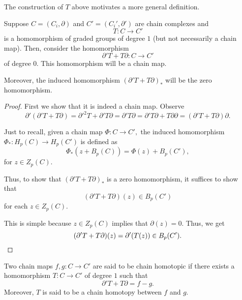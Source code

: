 \documentclass[12pt]{article}
\begin{document}
The construction of $T$ above motivates a more general definition.

\begin{prop}
	Suppose $C = (C_i, \partial)$ and $C' = (C_i', \partial')$ are chain complexes and
	\begin{equation*} 
		T: C \to C'
	\end{equation*}	
	is a homomorphism of graded groups of degree $1$ (but not necessarily a chain map). Then, consider the homomorphism
	\begin{equation*} 
		\partial' T + T\partial: C \to C'
	\end{equation*}
	of degree $0.$ This homomorphism will be a chain map.

	Moreover, the induced homomorphism $(\partial' T + T\partial)_*$ will be the zero homomorphism.
\end{prop}
\begin{proof} 
	First we show that it is indeed a chain map. Observe
	\begin{equation*} 
		\partial'(\partial' T + T\partial) = \partial'^2T + \partial'T\partial = \partial'T\partial = \partial'T\partial + T\partial\partial = (\partial'T + T\partial)\partial.
	\end{equation*}

	Just to recall, given a chain map $\Phi:C\to C',$ the induced homomorphism $\Phi_*:H_p(C) \to H_p(C')$ is defined as
	\begin{equation*} 
		\Phi_*(z + B_p(C)) = \Phi(z) + B_p(C'),
	\end{equation*}
	for $z \in Z_p(C).$

	Thus, to show that $(\partial' T + T\partial)_*$ is a zero homomorphism, it suffices to show that
	\begin{equation*} 
		(\partial' T + T\partial)(z) \in B_p(C')
	\end{equation*}
	for each $z \in Z_p(C).$

	This is simple because $z \in Z_p(C)$ implies that $\partial(z) = 0.$ Thus, we get
	\begin{equation*} 
		(\partial' T + T\partial)(z) = \partial'(T(z)) \in B_p(C'). \qedhere
	\end{equation*}
\end{proof}

\begin{defn}
	Two chain maps $f, g:C\to C'$ are said to be chain homotopic if there exists a homomorphism $T:C \to C'$ of degree $1$ such that 
	\begin{equation*} 
		\partial'T + T\partial = f - g.
	\end{equation*}
	Moreover, $T$ is said to be a chain homotopy between $f$ and $g.$
\end{defn}
\end{document}
